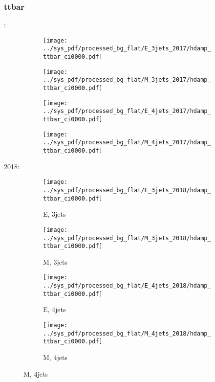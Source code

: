 \documentclass{beamer}
\begin{document}
\begin{frame}
\frametitle{ttbar}
\fontsize{5}{1}:
\begin{figure}
\centering
\begin{subfigure}[b]{0.24\textwidth}
\texttt{[image: ../sys\_pdf/processed\_bg\_flat/E\_3jets\_2017/hdamp\_ttbar\_ci0000.pdf]}
\end{subfigure}
\begin{subfigure}[b]{0.24\textwidth}
\texttt{[image: ../sys\_pdf/processed\_bg\_flat/M\_3jets\_2017/hdamp\_ttbar\_ci0000.pdf]}
\end{subfigure}
\begin{subfigure}[b]{0.24\textwidth}
\texttt{[image: ../sys\_pdf/processed\_bg\_flat/E\_4jets\_2017/hdamp\_ttbar\_ci0000.pdf]}
\end{subfigure}
\begin{subfigure}[b]{0.24\textwidth}
\texttt{[image: ../sys\_pdf/processed\_bg\_flat/M\_4jets\_2017/hdamp\_ttbar\_ci0000.pdf]}
\end{subfigure}
\end{figure}
2018:
\begin{figure}
\centering
\begin{subfigure}[b]{0.24\textwidth}
\texttt{[image: ../sys\_pdf/processed\_bg\_flat/E\_3jets\_2018/hdamp\_ttbar\_ci0000.pdf]}
\captionsetup{font=tiny}
\caption{E, 3jets}
\end{subfigure}
\begin{subfigure}[b]{0.24\textwidth}
\texttt{[image: ../sys\_pdf/processed\_bg\_flat/M\_3jets\_2018/hdamp\_ttbar\_ci0000.pdf]}
\captionsetup{font=tiny}
\caption{M, 3jets}
\end{subfigure}
\begin{subfigure}[b]{0.24\textwidth}
\texttt{[image: ../sys\_pdf/processed\_bg\_flat/E\_4jets\_2018/hdamp\_ttbar\_ci0000.pdf]}
\captionsetup{font=tiny}
\caption{E, 4jets}
\end{subfigure}
\begin{subfigure}[b]{0.24\textwidth}
\texttt{[image: ../sys\_pdf/processed\_bg\_flat/M\_4jets\_2018/hdamp\_ttbar\_ci0000.pdf]}
\captionsetup{font=tiny}
\caption{M, 4jets}
\end{subfigure}
\end{figure}
\end{frame}
\end{document}
